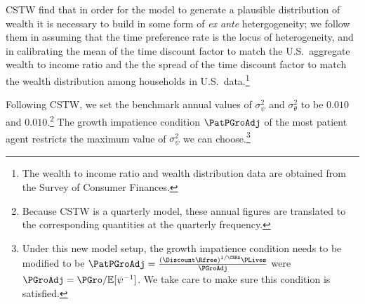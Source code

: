 \documentclass[../../cjSOE.tex]{subfiles}
\begin{document}
CSTW find that in order for the model to generate a plausible distribution of wealth it is necessary to build in some form of \textit{ex ante} hetergogeneity; we follow them in assuming that the time preference rate is the locus of heterogeneity, and in calibrating the mean of the time discount factor to match the U.S.\ aggregate wealth to income ratio and the the spread of the time discount factor to match the wealth distribution among households in U.S.\ data.\footnote{The wealth to income ratio and wealth distribution data are obtained from the Survey of Consumer Finances.}

Following CSTW, we set the benchmark annual values of $\sigma_{\psi}^{2}$ and $\sigma^{2}_{\theta}$ to be $0.010$ and $0.010$.\footnote{Because CSTW is a quarterly model, these annual figures are translated to the corresponding quantities at the quarterly frequency.}  The growth impatience condition $\PatPGroAdj$ of the most patient agent restricts the maximum value of $\sigma_{\psi}^{2}$ we can choose.\footnote{Under this new model setup, the growth impatience condition needs to be modified to be $\PatPGroAdj = \frac{(\Discount \Rfree)^{1/\CRRA}\PLives}{\PGroAdj}$ were $\PGroAdj=\PGro/\mathbb{E}[\psi^{-1}]$.  We take care to make sure this condition is satisfied.}

\end{document}
